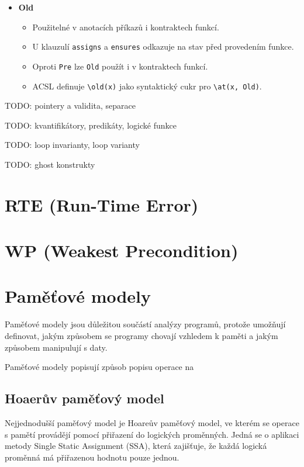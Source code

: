 \begin{itemize}
    \item \textbf{Old}
    \begin{itemize}
        \item Použitelné v anotacích příkazů i kontraktech funkcí.
        \item U klauzulí \texttt{assigns} a \texttt{ensures} odkazuje na stav před provedením funkce.
        \item Oproti \texttt{Pre} lze \texttt{Old} použít i v kontraktech funkcí.
        \item ACSL definuje \texttt{\textbackslash old(x)} jako syntaktický cukr pro \texttt{\textbackslash at(x, Old)}.
    \end{itemize}
\end{itemize}

TODO: pointery a validita, separace

TODO: kvantifikátory, predikáty, logické funkce

TODO: loop invarianty, loop varianty

TODO: ghost konstrukty

\section{RTE (Run-Time Error)}
\label{sec:frama-c-rte}


\section{WP (Weakest Precondition)}
\label{sec:frama-c-wp}


\section{Paměťové modely}
\label{sec:frama-c-mem}

Paměťové modely jsou důležitou součástí analýzy programů,
protože umožňují definovat, jakým způsobem se programy chovají
vzhledem k paměti a jakým způsobem manipulují s daty.

Paměťové modely popisují způsob popisu operace na

\subsection{Hoaerův paměťový model}
\label{subsec:hoaeruv-pametovy-model}

Nejjednodušší paměťový model je Hoareův paměťový model,
ve kterém se operace s pamětí provádějí pomocí přiřazení do logických proměnných.
Jedná se o aplikaci metody Single Static Assignment (SSA),
která zajišťuje, že každá logická proměnná má přiřazenou hodnotu pouze jednou.


